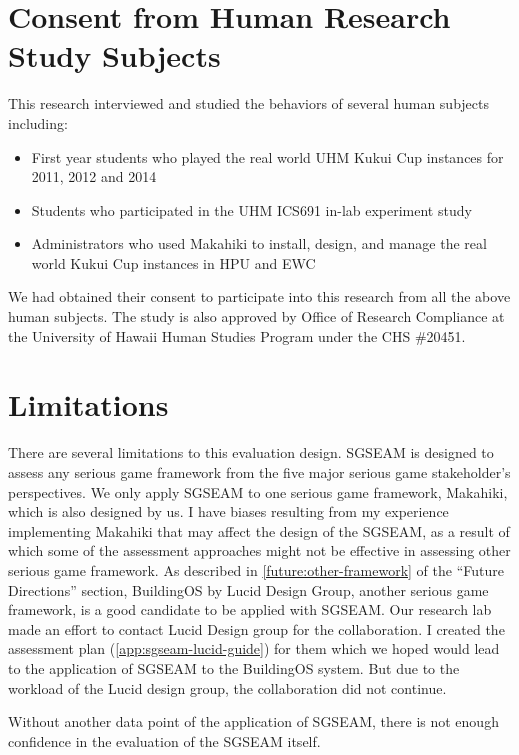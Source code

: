 \section{Consent from Human Research Study Subjects}
This research interviewed and studied the behaviors of several human subjects including:

\begin{itemize}
\item First year students who played the real world UHM Kukui Cup instances for 2011, 2012 and 2014
\item Students who participated in the UHM ICS691 in-lab experiment study
\item Administrators who used Makahiki to install, design, and manage the real world Kukui Cup instances in HPU and EWC
\end{itemize}

We had obtained their consent to participate into this research from all the above human subjects. The study is also approved by Office of Research Compliance at the University of Hawaii Human Studies Program under the CHS \#20451.

\section{Limitations}

There are several limitations to this evaluation design. SGSEAM is designed to assess any serious game framework from the five major serious game stakeholder's perspectives. We only apply SGSEAM to one serious game framework, Makahiki, which is also designed by us. I have biases resulting from my experience implementing Makahiki that may affect the design of the SGSEAM, as a result of which some of the assessment approaches might not be effective in assessing other serious game framework. As described in \autoref{future:other-framework} of the ``Future Directions'' section, BuildingOS\cite{building-dashboard} by Lucid Design Group, another serious game framework, is a good candidate to be applied with SGSEAM. Our research lab made an effort to contact Lucid Design group for the collaboration. I created the assessment plan (\autoref{app:sgseam-lucid-guide}) for them which we hoped would lead to the application of SGSEAM to the BuildingOS system. But due to the workload of the Lucid design group, the collaboration did not continue.

Without another data point of the application of SGSEAM, there is not enough confidence in the evaluation of the SGSEAM itself. 

